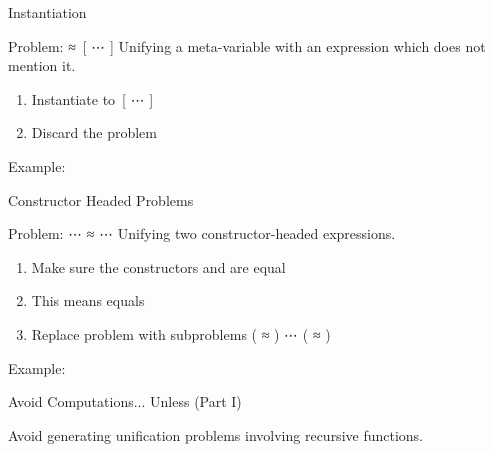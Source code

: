 \documentclass[compress,9pt]{beamer}
\begin{document}
\begin{frame}{Instantiation}
  \begin{alertblock}{Problem: { ≈ \,[ ⋯ ]}}
    Unifying a meta-variable with an expression which does not mention it.
  \end{alertblock}

  \bigskip
  \begin{enumerate}
    \item Instantiate  to {\,[ ⋯ ]}
    \item Discard the problem
  \end{enumerate}

  \bigskip Example:
\end{frame}

\begin{frame}{Constructor Headed Problems}

  \begin{alertblock}{Problem: {  ⋯  ≈   ⋯ }}
    Unifying two constructor-headed expressions.
  \end{alertblock}

  \bigskip
  \begin{enumerate}
    \item Make sure the constructors  and  are equal
    \item This means  equals 
    \item Replace problem with subproblems {( ≈ ) ⋯ ( ≈ )}
  \end{enumerate}

  \bigskip Example:
\end{frame}

\begin{frame}{Avoid Computations... Unless (Part I)}

  Avoid generating unification problems involving recursive functions.

  \begin{minipage}{0.45\textwidth}
  \end{minipage}\begin{minipage}{0.45\textwidth}
  \end{minipage}
  \bigskip
\end{frame}
\end{document}
